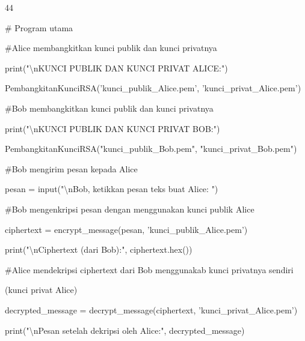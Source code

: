 \documentclass{article}
\begin{document}

44

\# Program utama

\#Alice membangkitkan kunci publik dan kunci privatnya

print("\textbackslash{}nKUNCI PUBLIK DAN KUNCI PRIVAT ALICE:")

PembangkitanKunciRSA('kunci\_publik\_Alice.pem', 'kunci\_privat\_Alice.pem')

\#Bob membangkitkan kunci publik dan kunci privatnya

print("\textbackslash{}nKUNCI PUBLIK DAN KUNCI PRIVAT BOB:")

PembangkitanKunciRSA("kunci\_publik\_Bob.pem", "kunci\_privat\_Bob.pem")

\#Bob mengirim pesan kepada Alice

pesan = input("\textbackslash{}nBob, ketikkan pesan teks buat Alice: ")

\#Bob mengenkripsi pesan dengan menggunakan kunci publik Alice

ciphertext = encrypt\_message(pesan, 'kunci\_publik\_Alice.pem')

print("\textbackslash{}nCiphertext (dari Bob):", ciphertext.hex())

\#Alice mendekripsi ciphertext dari Bob menggunakab kunci privatnya sendiri 

(kunci privat Alice)

decrypted\_message = decrypt\_message(ciphertext, 'kunci\_privat\_Alice.pem')

print("\textbackslash{}nPesan setelah dekripsi oleh Alice:", decrypted\_message)
\end{document}
